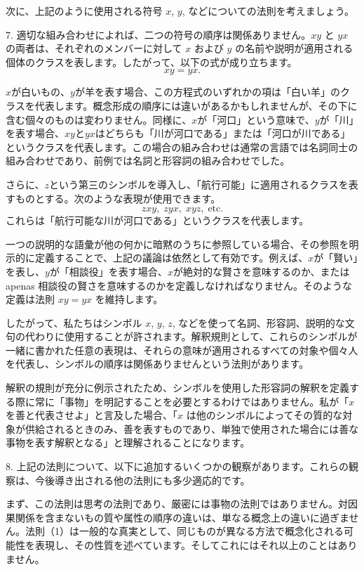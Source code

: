 \documentclass[a4paper,11pt,openany]{ltjsbook}
\begin{document}
次に、上記のように使用される符号 $x$, $y$, などについての法則を考えましょう。

7. 適切な組み合わせによれば、二つの符号の順序は関係ありません。$xy$ と $yx$ の両者は、それぞれのメンバーに対して $x$ および $y$ の名前や説明が適用される個体のクラスを表します。したがって、以下の式が成り立ちます。
\[
xy = yx.
\]

$x$が白いもの、$y$が羊を表す場合、この方程式のいずれかの項は「白い羊」のクラスを代表します。概念形成の順序には違いがあるかもしれませんが、その下に含む個々のものは変わりません。同様に、$x$が「河口」という意味で、$y$が「川」を表す場合、$xy$と$yx$はどちらも「川が河口である」または「河口が川である」というクラスを代表します。この場合の組み合わせは通常の言語では名詞同士の組み合わせであり、前例では名詞と形容詞の組み合わせでした。

さらに、$z$という第三のシンボルを導入し、「航行可能」に適用されるクラスを表すものとする。次のような表現が使用できます。
\[
zxy,\; zyx,\; xyz,\; \text{etc.}
\]
これらは「航行可能な川が河口である」というクラスを代表します。

一つの説明的な語彙が他の何かに暗黙のうちに参照している場合、その参照を明示的に定義することで、上記の議論は依然として有効です。例えば、$x$が「賢い」を表し、$y$が「相談役」を表す場合、$x$が絶対的な賢さを意味するのか、または apenas 相談役の賢さを意味するのかを定義しなければなりません。そのような定義は法則 $xy = yx$ を維持します。

したがって、私たちはシンボル $x$, $y$, $z$, などを使って名詞、形容詞、説明的な文句の代わりに使用することが許されます。解釈規則として、これらのシンボルが一緒に書かれた任意の表現は、それらの意味が適用されるすべての対象や個々人を代表し、シンボルの順序は関係ありませんという法則があります。

解釈の規則が充分に例示されたため、シンボルを使用した形容詞の解釈を定義する際に常に「事物」を明記することを必要とするわけではありません。私が「$x$ を善と代表させよ」と言及した場合、「$x$ は他のシンボルによってその質的な対象が供給されるときのみ、善を表すものであり、単独で使用された場合には善な事物を表す解釈となる」と理解されることになります。

8. 上記の法則について、以下に追加するいくつかの観察があります。これらの観察は、今後導き出される他の法則にも多少適応的です。

まず、この法則は思考の法則であり、厳密には事物の法則ではありません。対因果関係を含まないもの質や属性の順序の違いは、単なる概念上の違いに過ぎません。法則（1）は一般的な真実として、同じものが異なる方法で概念化される可能性を表現し、その性質を述べています。そしてこれにはそれ以上のことはありません。
\end{document}

